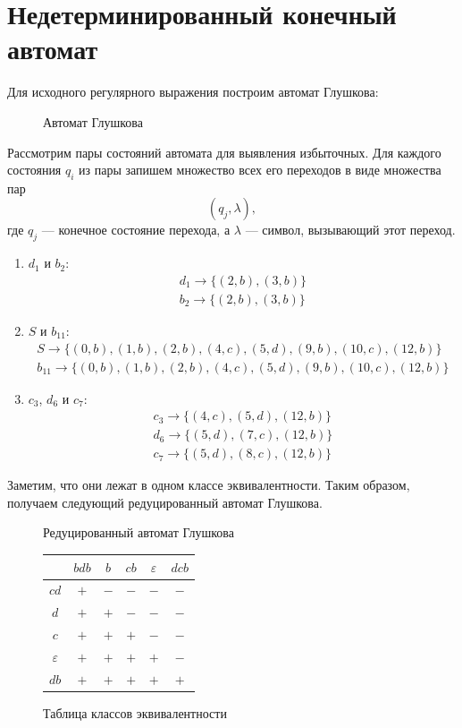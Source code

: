 \documentclass[a4paper, 14pt]{extarticle}
\begin{document}
\section{Недетерминированный конечный автомат}
Для исходного регулярного выражения построим автомат Глушкова:
\begin{figure}[H]
\centering
\scalebox{1.2}{}
\caption{Автомат Глушкова}
\end{figure}
Рассмотрим пары состояний автомата для выявления избыточных. 
Для каждого состояния $q_i$ из пары запишем множество всех его переходов в виде множества пар 
\[
(q_j, \lambda),
\] 
где $q_j$ — конечное состояние перехода, а $\lambda$ — символ, вызывающий этот переход.
\begin{enumerate}
  \itemsep -0.8pt
  \item $d_1$ и $b_2$:
    \begin{gather*}
      d_1 \to \{(2, b), (3, b)\}\\
      b_2 \to \{(2, b), (3, b)\}
    \end{gather*}
  \item $S$ и $b_{11}$:
    \begin{gather*}
      S \to \{(0, b), (1, b), (2, b), (4, c), (5, d), (9, b), (10, c), (12, b)\}\\
      b_{11} \to \{(0, b), (1, b), (2, b), (4, c), (5, d), (9, b), (10, c), (12, b)\}
    \end{gather*}
  \item $c_3$, $d_6$ и $c_7$:
    \begin{gather*}
      c_3 \to \{(4, c), (5, d), (12, b)\}\\
      d_6 \to \{(5, d), (7, c), (12, b)\}\\
      c_7 \to \{(5, d), (8, c), (12, b)\}
    \end{gather*}
\end{enumerate}
Заметим, что они лежат в одном классе эквивалентности. Таким образом, получаем следующий редуцированный автомат Глушкова.
\begin{figure}[h]
\centering
\scalebox{1.2}{}
\caption{Редуцированный автомат Глушкова}
\end{figure}
\begin{figure}[H]
\centering
\begin{tabular}{|c|c|c|c|c|c|}
\hline
 & $bdb$ & $b$ & $cb$ & $\varepsilon$ & $dcb$ \\
\hline
$cd$ & $+$ & $-$ & $-$ & $-$ & $-$ \\
\hline
$d$  & $+$ & $+$ & $-$ & $-$ & $-$ \\
\hline
$c$  & $+$ & $+$ & $+$ & $-$ & $-$ \\
\hline
$\varepsilon$ & $+$ & $+$ & $+$ & $+$ & $-$ \\
\hline
$db$ & $+$ & $+$ & $+$ & $+$ & $+$ \\
\hline
\end{tabular}
\caption{Таблица классов эквивалентности}
\end{figure}
\end{document}
